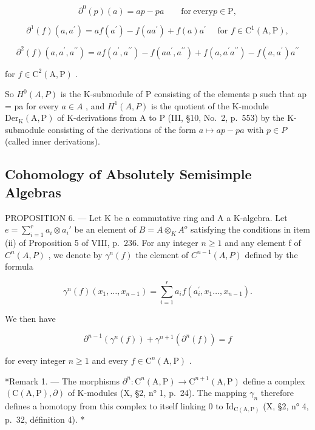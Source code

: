 \[
\partial^ {0} (p) (a) = a p - p a \qquad \mathrm{for\ every} p \in \mathrm{P},\tag{12}
\]

\[
\partial^ {1} (f) \left(a, a ^ {\prime}\right) = a f \left(a ^ {\prime}\right) - f \left(a a ^ {\prime}\right) + f (a) a ^ {\prime} \quad \text { for } f \in \mathrm{C} ^ {1} (\mathrm{A}, \mathrm{P}),\tag{13}
\]

\[
\partial^ {2} (f) \left(a, a ^ {\prime}, a ^ {\prime \prime}\right) = a f \left(a ^ {\prime}, a ^ {\prime \prime}\right) - f \left(a a ^ {\prime}, a ^ {\prime \prime}\right) + f \left(a, a ^ {\prime} a ^ {\prime \prime}\right) - f \left(a, a ^ {\prime}\right) a ^ {\prime \prime}\tag{14}
\]

for \(f \in \mathrm{C}^2(\mathrm{A},\mathrm{P})\) .

So \(H^{0}(A,P)\) is the K-submodule of P consisting of the elements p such that ap = pa for every \(a \in A\) , and \(H^{1}(A,P)\) is the quotient of the K-module \(\mathrm{Der}_{\mathrm{K}}(\mathrm{A},\mathrm{P})\) of K-derivations from A to P (III, §10, No.~2, p.~553) by the K-submodule consisting of the derivations of the form \(a \mapsto ap - pa\) with \(p \in P\) (called inner derivations).

\subsection{Cohomology of Absolutely Semisimple Algebras}

PROPOSITION 6. --- Let K be a commutative ring and A a K-algebra. Let \(e = \sum_{i=1}^{r} a_i \otimes a_i'\) be an element of \(B = A \otimes_K A^o\) satisfying the conditions in item (ii) of Proposition 5 of VIII, p.~236. For any integer \(n \geqslant 1\) and any element f of \(C^n(A, P)\) , we denote by \(\gamma^n(f)\) the element of \(C^{n-1}(A, P)\) defined by the formula

\[
\gamma^ {n} (f) \left(x _ {1}, \dots , x _ {n - 1}\right) = \sum_ {i = 1} ^ {r} a _ {i} f \left(a _ {i} ^ {\prime}, x _ {1} \dots , x _ {n - 1}\right).\tag{15}
\]

We then have

\[
\partial^ {n - 1} (\gamma^ {n} (f)) + \gamma^ {n + 1} (\partial^ {n} (f)) = f\tag{16}
\]

for every integer \(n \geqslant 1\) and every \(f \in \mathrm{C}^n(\mathrm{A},\mathrm{P})\) .

*Remark 1. --- The morphisms \(\partial^n: \mathrm{C}^n(\mathrm{A},\mathrm{P}) \to \mathrm{C}^{n+1}(\mathrm{A},\mathrm{P})\) define a complex \((\mathrm{C}(\mathrm{A},\mathrm{P}),\partial)\) of K-modules (X, §2, n° 1, p.~24). The mapping \(\gamma_n\) therefore defines a homotopy from this complex to itself linking 0 to \(\mathrm{Id}_{\mathrm{C}(\mathrm{A},\mathrm{P})}\) (X, §2, n° 4, p.~32, définition 4). *

